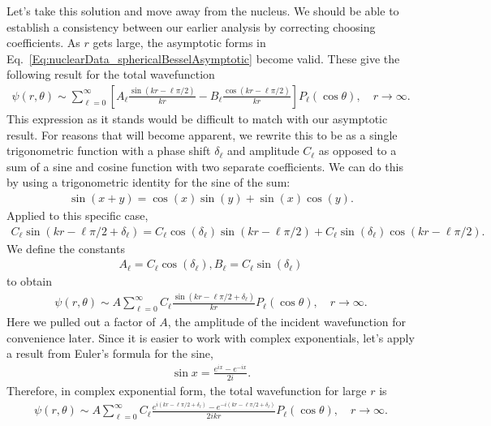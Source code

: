 Let's take this solution and move away from the nucleus. We should be able to establish a consistency between our earlier analysis by correcting choosing coefficients. As $r$ gets large, the asymptotic forms in Eq.~\eqref{Eq:nuclearData_sphericalBesselAsymptotic} become valid. These give the following result for the total wavefunction
\begin{align}
  \psi(r,\theta) \sim \sum_{\ell = 0}^\infty \left[ A_\ell \frac{\sin(kr - \ell \pi/2)}{kr} - B_\ell \frac{\cos(kr - \ell \pi/2)}{kr} \right] P_\ell(\cos\theta) , \quad r \rightarrow \infty .
\end{align}
This expression as it stands would be difficult to match with our asymptotic result. For reasons that will become apparent, we rewrite this to be as a single trigonometric function with a phase shift $\delta_\ell$ and amplitude $C_\ell$ as opposed to a sum of a sine and cosine function with two separate coefficients. We can do this by using a trigonometric identity for the sine of the sum:
\begin{align}
  \sin(x + y) = \cos(x) \sin(y) + \sin(x) \cos(y) . \nonumber
\end{align}
Applied to this specific case,
\begin{align}
  C_\ell \sin(kr - \ell \pi/2 + \delta_\ell) = 
  C_\ell \cos(\delta_\ell) \sin( kr - \ell \pi/2 ) + C_\ell \sin(\delta_\ell) \cos( kr - \ell \pi/2 ) .
\end{align}
We define the constants 
\begin{subequations} \label{Eq:nuclearData_radialSchrodingerConstantRedefinition}
\begin{align}
  A_\ell = C_\ell \cos(\delta_\ell),
  B_\ell = C_\ell \sin(\delta_\ell)
\end{align}
\end{subequations}
to obtain
\begin{align}
  \psi(r,\theta) \sim A \sum_{\ell = 0}^\infty C_\ell \frac{\sin(kr - \ell \pi/2 + \delta_\ell)}{kr}  P_\ell(\cos\theta) , \quad r \rightarrow \infty .
\end{align}
Here we pulled out a factor of $A$, the amplitude of the incident wavefunction for convenience later. Since it is easier to work with complex exponentials, let's apply a result from Euler's formula for the sine,
\begin{align}
  \sin x = \frac{ e^{ix} - e^{-ix} }{ 2 i } . \nonumber
\end{align}
Therefore, in complex exponential form, the total wavefunction for large $r$ is
\begin{align} \label{Eq:nuclearData_totalWavefunctionComplexExponentials}
  \psi(r,\theta) \sim A \sum_{\ell = 0}^\infty C_\ell \frac{e^{i(kr - \ell \pi/2 + \delta_\ell)} - e^{-i(kr - \ell \pi/2 + \delta_\ell)} }{2ikr}  P_\ell(\cos\theta) , \quad r \rightarrow \infty .
\end{align}


